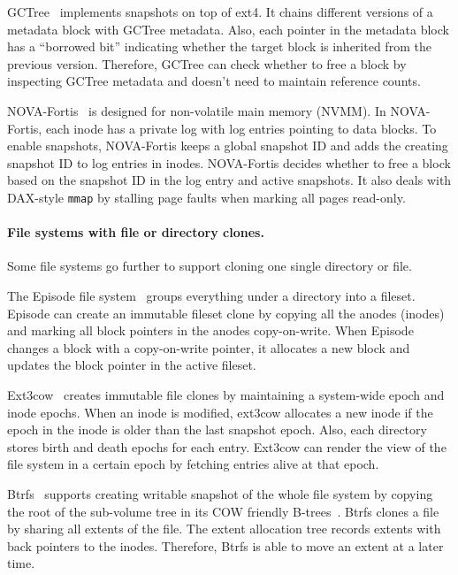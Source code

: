 GCTree~\citep{gctree} implements snapshots on top of ext4.
It chains different versions of a metadata block with GCTree metadata.
Also, each pointer in the metadata block has a ``borrowed bit'' indicating
whether the target block is inherited from the previous version.
Therefore, GCTree can check whether to free a block by inspecting GCTree
metadata and doesn't need to maintain reference counts.

NOVA-Fortis~\citep{nova} is designed for non-volatile main memory (NVMM).
In NOVA-Fortis, each inode has a private log with log entries pointing
to data blocks.
To enable snapshots, NOVA-Fortis keeps a global snapshot ID and adds the
creating snapshot ID to log entries in inodes.
NOVA-Fortis decides whether to free a block based on the snapshot ID in the log
entry and active snapshots.
It also deals with DAX-style \texttt{mmap} by stalling page faults when marking
all pages read-only.

\paragraph{File systems with file or directory clones.}

Some file systems go further to support cloning one single directory or file.

The Episode file system~\citep{episode} groups everything under a directory into
a fileset.
Episode can create an immutable fileset clone by copying all the anodes (inodes)
and marking all block pointers in the anodes copy-on-write.
When Episode changes a block with a copy-on-write pointer, it allocates a new
block and updates the block pointer in the active fileset.

Ext3cow~\citep{ext3cow} creates immutable file clones by maintaining a
system-wide epoch and inode epochs.
When an inode is modified, ext3cow allocates a new inode if the epoch in the
inode is older than the last snapshot epoch.
Also, each directory stores birth and death epochs for each entry.
Ext3cow can render the view of the file system in a certain epoch by fetching
entries alive at that epoch.

Btrfs~\citep{btrfs} supports creating writable snapshot of the whole file system
by copying the root of the sub-volume tree in its COW friendly
B-trees~\citep{cowbtree}.
Btrfs clones a file by sharing all extents of the file.
The extent allocation tree records extents with back pointers to the inodes.
Therefore, Btrfs is able to move an extent at a later time.

